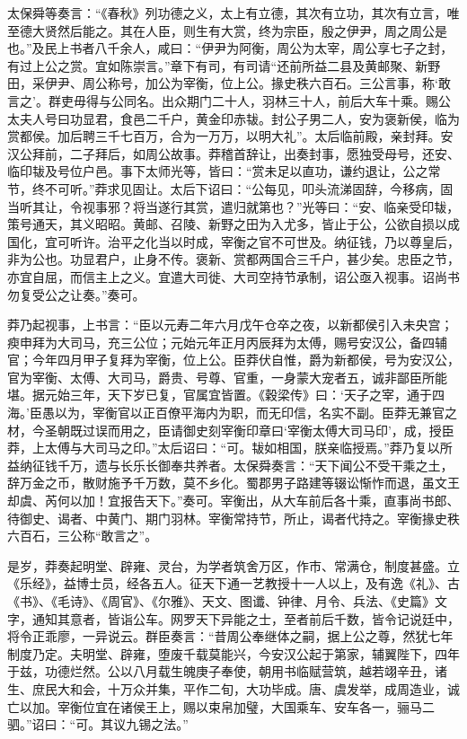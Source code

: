 \documentclass[12pt,UTF8]{ctexbook}
\begin{document}
太保舜等奏言：“《春秋》列功德之义，太上有立德，其次有立功，其次有立言，唯至德大贤然后能之。其在人臣，则生有大赏，终为宗臣，殷之伊尹，周之周公是也。”及民上书者八千余人，咸曰：“伊尹为阿衡，周公为太宰，周公享七子之封，有过上公之赏。宜如陈崇言。”章下有司，有司请“还前所益二县及黄邮聚、新野田，采伊尹、周公称号，加公为宰衡，位上公。掾史秩六百石。三公言事，称‘敢言之’。群吏毋得与公同名。出众期门二十人，羽林三十人，前后大车十乘。赐公太夫人号曰功显君，食邑二千户，黄金印赤韨。封公子男二人，安为褒新侯，临为赏都侯。加后聘三千七百万，合为一万万，以明大礼”。太后临前殿，亲封拜。安汉公拜前，二子拜后，如周公故事。莽稽首辞让，出奏封事，愿独受母号，还安、临印韨及号位户邑。事下太师光等，皆曰：“赏未足以直功，谦约退让，公之常节，终不可听。”莽求见固让。太后下诏曰：“公每见，叩头流涕固辞，今移病，固当听其让，令视事邪？将当遂行其赏，遣归就第也？”光等曰：“安、临亲受印韨，策号通天，其义昭昭。黄邮、召陵、新野之田为入尤多，皆止于公，公欲自损以成国化，宜可听许。治平之化当以时成，宰衡之官不可世及。纳征钱，乃以尊皇后，非为公也。功显君户，止身不传。褒新、赏都两国合三千户，甚少矣。忠臣之节，亦宜自屈，而信主上之义。宜遣大司徙、大司空持节承制，诏公亟入视事。诏尚书勿复受公之让奏。”奏可。



莽乃起视事，上书言：“臣以元寿二年六月戊午仓卒之夜，以新都侯引入未央宫；瘐申拜为大司马，充三公位；元始元年正月丙辰拜为太傅，赐号安汉公，备四辅官；今年四月甲子复拜为宰衡，位上公。臣莽伏自惟，爵为新都侯，号为安汉公，官为宰衡、太傅、大司马，爵贵、号尊、官重，一身蒙大宠者五，诚非鄙臣所能堪。据元始三年，天下岁已复，官属宜皆置。《穀梁传》曰：‘天子之宰，通于四海。’臣愚以为，宰衡官以正百僚平海内为职，而无印信，名实不副。臣莽无兼官之材，今圣朝既过误而用之，臣请御史刻宰衡印章曰‘宰衡太傅大司马印’，成，授臣莽，上太傅与大司马之印。”太后诏曰：“可。韨如相国，朕亲临授焉。”莽乃复以所益纳征钱千万，遗与长乐长御奉共养者。太保舜奏言：“天下闻公不受干乘之土，辞万金之币，散财施予千万数，莫不乡化。蜀郡男子路建等辍讼惭怍而退，虽文王却虞、芮何以加！宜报告天下。”奏可。宰衡出，从大车前后各十乘，直事尚书郎、待御史、谒者、中黄门、期门羽林。宰衡常持节，所止，谒者代持之。宰衡掾史秩六百石，三公称“敢言之”。



是岁，莽奏起明堂、辟雍、灵台，为学者筑舍万区，作市、常满仓，制度甚盛。立《乐经》，益博士员，经各五人。征天下通一艺教授十一人以上，及有逸《礼》、古《书》、《毛诗》、《周官》、《尔雅》、天文、图谶、钟律、月令、兵法、《史篇》文字，通知其意者，皆诣公车。网罗天下异能之士，至者前后千数，皆令记说廷中，将令正乖廖，一异说云。群臣奏言：“昔周公奉继体之嗣，据上公之尊，然犹七年制度乃定。夫明堂、辟雍，堕废千载莫能兴，今安汉公起于第家，辅翼陛下，四年于兹，功德烂然。公以八月载生魄庚子奉使，朝用书临赋营筑，越若翊辛丑，诸生、庶民大和会，十万众并集，平作二旬，大功毕成。唐、虞发举，成周造业，诚亡以加。宰衡位宜在诸侯王上，赐以束帛加璧，大国乘车、安车各一，骊马二驷。”诏曰：“可。其议九锡之法。”
\end{document}

